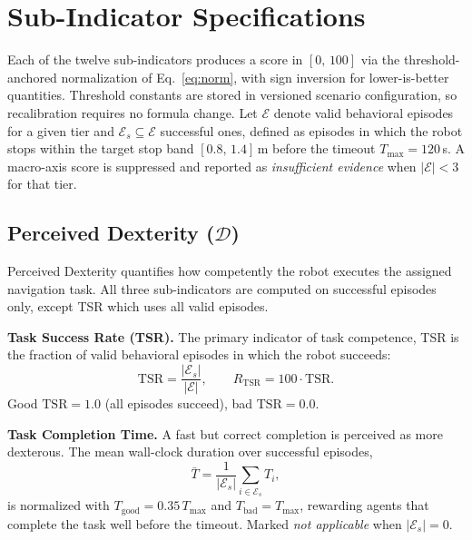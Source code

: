 \documentclass[conference]{IEEEtran}
\begin{document}
\newpage %




\appendices

\section{Sub-Indicator Specifications}
\label{app:metrics}

Each of the twelve sub-indicators produces a score in $[0,\,100]$ via the
threshold-anchored normalization of Eq.~\eqref{eq:norm}, with sign inversion
for lower-is-better quantities.
Threshold constants are stored in versioned scenario configuration, so
recalibration requires no formula change.
Let $\mathcal{E}$ denote valid behavioral episodes for a given tier and
$\mathcal{E}_s \subseteq \mathcal{E}$ successful ones, defined as episodes in
which the robot stops within the target stop band $[0.8,\,1.4]$\,m before the
timeout $T_{\max} = 120$\,s.
A macro-axis score is suppressed and reported as \textit{insufficient evidence}
when $|\mathcal{E}| < 3$ for that tier.

\subsection{Perceived Dexterity ($\mathcal{D}$)}

Perceived Dexterity quantifies how competently the robot executes the assigned
navigation task. All three sub-indicators are computed on successful episodes
only, except TSR which uses all valid episodes.

\textbf{Task Success Rate (TSR).}
The primary indicator of task competence, TSR is the fraction of valid
behavioral episodes in which the robot succeeds:
\begin{equation}
  \text{TSR} = \frac{|\mathcal{E}_s|}{|\mathcal{E}|}, \qquad
  R_\text{TSR} = 100 \cdot \text{TSR}.
\end{equation}
Good $\text{TSR} = 1.0$ (all episodes succeed), bad $\text{TSR} = 0.0$.

\textbf{Task Completion Time.}
A fast but correct completion is perceived as more dexterous.
The mean wall-clock duration over successful episodes,
\begin{equation}
  \bar{T} = \frac{1}{|\mathcal{E}_s|}\sum_{i \in \mathcal{E}_s} T_i,
\end{equation}
is normalized with $T_\text{good} = 0.35\,T_{\max}$ and $T_\text{bad} =
T_{\max}$, rewarding agents that complete the task well before the timeout.
Marked \textit{not applicable} when $|\mathcal{E}_s| = 0$.
\end{document}
